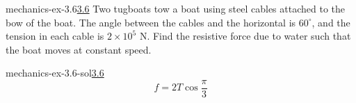 \documentclass[preview]{standalone}
\begin{document}
\begin{snippetexercise}{mechanics-ex-3.6}{\underline{3.6}}
    Two tugboats tow a boat using steel cables attached to the bow of the boat. The angle between the cables and the horizontal is $60^\circ$, and the tension in each cable is $2 \times 10^5$ N. Find the resistive force due to water such that the boat moves at constant speed.
\end{snippetexercise}

\begin{snippetsolution}{mechanics-ex-3.6-sol}{\underline{3.6}}
    \[ f = 2T\cos\frac{\pi}{3} \]
\end{snippetsolution}
\end{document}
